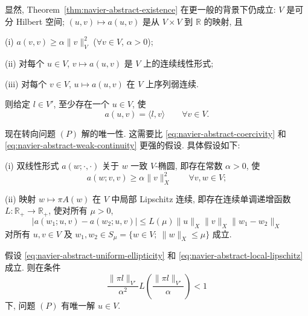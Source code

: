 \setcounter{statement}{0}
\begin{Remark}\label{rem:navier-general-existence-context}
显然, Theorem~\ref{thm:navier-abstract-existence} 在更一般的背景下仍成立:
$V$ 是可分 Hilbert 空间; $(u,v)\mapsto a(u,v)$ 是从 $V\times V$ 到 $\mathbb R$ 的映射, 且

\textup{(i)} $a(v,v)\geq\alpha\|v\|_V^2$ ($\forall v\in V$, $\alpha>0$);

\textup{(ii)} 对每个 $u\in V$, $v\mapsto a(u,v)$ 是 $V$ 上的连续线性形式;

\textup{(iii)} 对每个 $v\in V$, $u\mapsto a(u,v)$ 在 $V$ 上序列弱连续.

则给定 $l\in V'$, 至少存在一个 $u\in V$, 使
\[
a(u,v)=\langle l,v\rangle
\qquad\forall v\in V.
\]
\end{Remark}

现在转向问题 $(P)$ 解的唯一性. 这需要比
\eqref{eq:navier-abstract-coercivity} 和
\eqref{eq:navier-abstract-weak-continuity} 更强的假设. 具体假设如下:

\textup{(i)} 双线性形式 $a(w;\cdot,\cdot)$ 关于 $w$ 一致 $V$-椭圆,
即存在常数 $\alpha>0$, 使
\begin{equation}\label{eq:navier-abstract-uniform-ellipticity}
a(w;v,v)\geq\alpha\|v\|_X^2
\qquad\forall v,w\in V;
\end{equation}

\textup{(ii)} 映射 $w\mapsto\pi A(w)$ 在 $V$ 中局部 Lipschitz 连续,
即存在连续单调递增函数 $L:\mathbb R_+\to\mathbb R_+$,
使对所有 $\mu>0$,
\begin{equation}\label{eq:navier-abstract-local-lipschitz}
\left|a(w_1;u,v)-a(w_2;u,v)\right|
\leq L(\mu)\|u\|_X\|v\|_X\|w_1-w_2\|_X
\end{equation}
对所有 $u,v\in V$ 及
$w_1,w_2\in S_\mu=\{w\in V;\ \|w\|_X\leq\mu\}$ 成立.

\setcounter{statement}{2}
\begin{Theorem}\label{thm:navier-abstract-uniqueness}
假设 \eqref{eq:navier-abstract-uniform-ellipticity} 和
\eqref{eq:navier-abstract-local-lipschitz} 成立. 则在条件
\begin{equation}\label{eq:navier-abstract-small-data-condition}
\frac{\|\pi l\|_{V'}}{\alpha^2}
L\!\left(\frac{\|\pi l\|_{V'}}{\alpha}\right)<1
\end{equation}
下, 问题 $(P)$ 有唯一解 $u\in V$.
\end{Theorem}

